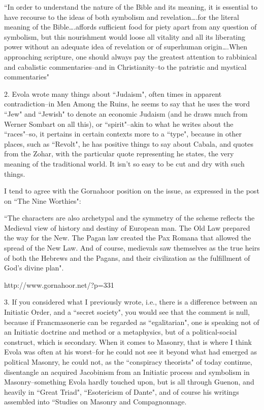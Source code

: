 \begin{footnotesize}
\begin{sffamily}
``In order to understand the nature of the Bible and its meaning, it is essential to have recourse to the ideas of both symbolism and revelation….for the literal meaning of the Bible….affords sufficient food for piety apart from any question of symbolism, but this nourishment would loose all vitality and all its liberating power without an adequate idea of revelation or of superhuman origin….When approaching scripture, one should always pay the greatest attention to rabbinical and cabalistic commentaries–and in Christianity–to the patristic and mystical commentaries"

2. Evola wrote many things about ``Judaism", often times in apparent contradiction–in Men Among the Ruins, he seems to say that he uses the word ``Jew" and ``Jewish" to denote an economic Judaism (and he draws much from Werner Sombart on all this), or ``spirit"–akin to what he writes about the ``races"–so, it pertains in certain contexts more to a ``type", because in other places, such as ``Revolt", he has positive things to say about Cabala, and quotes from the Zohar, with the particular quote representing he states, the very meaning of the traditional world. It isn't so easy to be cut and dry with such things. 

I tend to agree with the Gornahoor position on the issue, as expressed in the post on ``The Nine Worthies":

``The characters are also archetypal and the symmetry of the scheme reflects the Medieval view of history and destiny of European man. The Old Law prepared the way for the New. The Pagan law created the Pax Romana that allowed the spread of the New Law. And of course, medievals saw themselves as the true heirs of both the Hebrews and the Pagans, and their civilization as the fulfillment of God's divine plan".

http://www.gornahoor.net/?p=331

3. If you considered what I previously wrote, i.e., there is a difference between an Initiatic Order, and a ``secret society", you would see that the comment is null, because if Francmasonerie can be regarded as ``egalitarian", one is speaking not of an Initiatic doctrine and method or a metaphysics, but of a political-social construct, which is secondary. When it comes to Masonry, that is where I think Evola was often at his worst–for he could not see it beyond what had emerged as political Masonry, he could not, as the ``conspiracy theorists" of today continue, disentangle an acquired Jacobinism from an Initiatic process and symbolism in Masonry–something Evola hardly touched upon, but is all through Guenon, and heavily in ``Great Triad", ``Esotericism of Dante", and of course his writings assembled into ``Studies on Masonry and Compagnonnage.


\end{sffamily}
\end{footnotesize}
